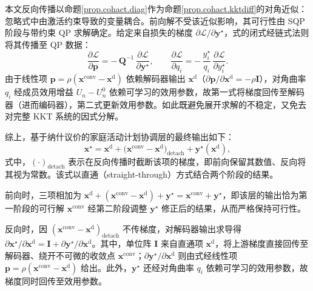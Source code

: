 本文反向传播以命题\ref{prop.cohact.diag}作为命题\ref{prop.cohact.kktdiff}的对角近似：忽略式中由激活约束导致的变量耦合。前向解不受该近似影响，其可行性由 SQP 阶段与带约束 QP 求解确定。给定来自损失的梯度 $\partial\mathcal{L}/\partial\mathbf{y}^{\star}$，式的闭式经链式法则将其传播至 QP 数据：
\begin{equation}
\frac{\partial\mathcal{L}}{\partial\mathbf{p}}=-\,\mathbf{Q}^{-1}\,\frac{\partial\mathcal{L}}{\partial\mathbf{y}^{\star}},
\qquad
\frac{\partial\mathcal{L}}{\partial q_i}=-\,\frac{y_i^{\star}}{q_i}\,\frac{\partial\mathcal{L}}{\partial y_i^{\star}}.
\label{eq.cohact.chain}
\end{equation}
由于线性项 $\mathbf{p}=\rho(\mathbf{x}^{\mathrm{conv}}-\mathbf{x}^{\mathrm{d}})$ 依赖解码器输出 $\mathbf{x}^{\mathrm{d}}$（$\partial\mathbf{p}/\partial\mathbf{x}^{\mathrm{d}}=-\rho\mathbf{I}$），对角曲率 $q_i$ 经成员效用增益 $U_n-U_n^{0}$ 依赖可学习的效用参数，故第一式将梯度回传至解码器（进而编码器），第二式更新效用参数。如此既避免展开求解的不稳定，又免去对完整 KKT 系统的因式分解。

综上，基于纳什议价的家庭活动计划协调层的最终输出如下：
\begin{equation}
\mathbf{x}^{\star}=\mathbf{x}^{\mathrm{d}}+\bigl(\mathbf{x}^{\mathrm{conv}}-\mathbf{x}^{\mathrm{d}}\bigr)_{\mathrm{detach}}+\mathbf{y}^{\star}(\mathbf{x}^{\mathrm{d}}),
\label{eq.cohact.straightthrough}
\end{equation}
式中，$(\cdot)_{\mathrm{detach}}$ 表示在反向传播时截断该项的梯度，即前向保留其数值、反向将其视为常数。该式以直通（straight-through）方式结合两个阶段的结果。

前向时，三项相加为 $\mathbf{x}^{\mathrm{d}}+(\mathbf{x}^{\mathrm{conv}}-\mathbf{x}^{\mathrm{d}})+\mathbf{y}^{\star}=\mathbf{x}^{\mathrm{conv}}+\mathbf{y}^{\star}$，即该层的输出恰为第一阶段的可行解 $\mathbf{x}^{\mathrm{conv}}$ 经第二阶段调整 $\mathbf{y}^{\star}$ 修正后的结果，从而严格保持可行性。

反向时，因 $(\mathbf{x}^{\mathrm{conv}}-\mathbf{x}^{\mathrm{d}})_{\mathrm{detach}}$ 不传梯度，对解码器输出求导得 $\partial\mathbf{x}^{\star}/\partial\mathbf{x}^{\mathrm{d}}=\mathbf{I}+\partial\mathbf{y}^{\star}/\partial\mathbf{x}^{\mathrm{d}}$。其中，单位阵 $\mathbf{I}$ 来自直通项 $\mathbf{x}^{\mathrm{d}}$，将上游梯度直接回传至解码器、绕开不可微的收敛点 $\mathbf{x}^{\mathrm{conv}}$；$\partial\mathbf{y}^{\star}/\partial\mathbf{x}^{\mathrm{d}}$ 则由式经线性项 $\mathbf{p}=\rho(\mathbf{x}^{\mathrm{conv}}-\mathbf{x}^{\mathrm{d}})$ 给出。此外，$\mathbf{y}^{\star}$ 还经对角曲率 $q_i$ 依赖可学习的效用参数，故梯度同时回传至效用参数。

